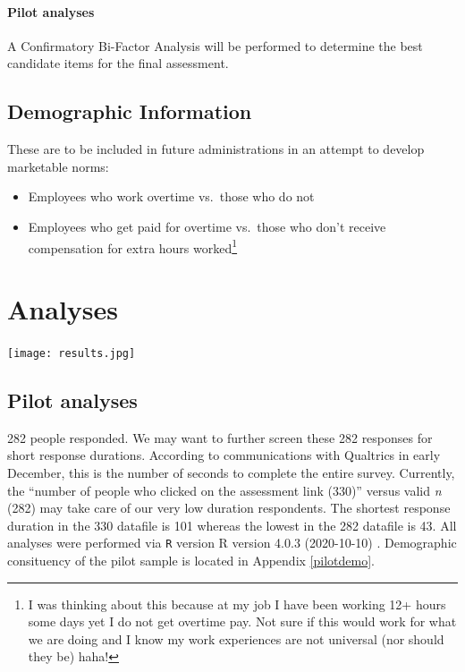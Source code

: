 \documentclass[
]{book}
\providecommand{\tightlist}{%
  \setlength{\itemsep}{0pt}\setlength{\parskip}{0pt}}
\begin{document}
\hypertarget{pilot-analyses}{%
\subsubsection{Pilot analyses}\label{pilot-analyses}}

A Confirmatory Bi-Factor Analysis will be performed to determine the best candidate items for the final assessment.

\hypertarget{demographic-information}{%
\section{Demographic Information}\label{demographic-information}}

These are to be included in future administrations in an attempt to develop marketable norms:

\begin{itemize}
\tightlist
\item
  Employees who work overtime vs.~those who do not
\item
  Employees who get paid for overtime vs.~those who don't receive compensation for extra hours worked\footnote{I was thinking about this because at my job I have been working 12+ hours some days yet I do not get overtime pay. Not sure if this would work for what we are doing and I know my work experiences are not universal (nor should they be) haha!}
\end{itemize}

\hypertarget{analyses}{%
\chapter{Analyses}\label{analyses}}

\texttt{[image: results.jpg]}

\hypertarget{pilot-analyses-1}{%
\section{Pilot analyses}\label{pilot-analyses-1}}

282 people responded. We may want to further screen these 282 responses for short response durations. According to communications with Qualtrics in early December, this is the number of seconds to complete the entire survey. Currently, the ``number of people who clicked on the assessment link (330)'' versus valid \emph{n} (282) may take care of our very low duration respondents. The shortest response duration in the 330 datafile is 101 whereas the lowest in the 282 datafile is 43. All analyses were performed via \texttt{R} version R version 4.0.3 (2020-10-10) \citep{R-base}. Demographic consituency of the pilot sample is located in Appendix \ref{pilotdemo}.
\end{document}

